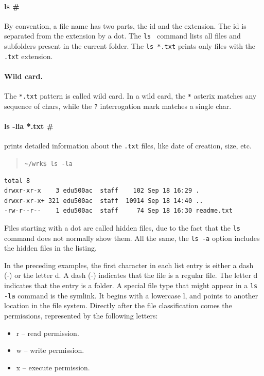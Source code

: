 \documentclass[a4paper,12pt]{book}
\begin{document}
\paragraph{ls \#} 
By convention, a file name has
two parts, the id and the extension. The id
is separated from the extension by a dot.
The \verb|ls | command lists all files
and subfolders present in the current folder.
The \verb|ls *.txt| prints only files
with the \verb|.txt| extension.

\paragraph{Wild card.} The 
\verb|*.txt| pattern
is called wild card.
In a wild card, the \verb|*| asterix matches
any sequence of chars, while the \verb|?|
interrogation mark matches a single char.

\paragraph{ls -lia *.txt \#} prints detailed
information about the \verb|.txt| files,
like date of creation, size, etc.
\begin{quote}
\verb|~/wrk$ ls -la |  
\end{quote}
\begin{verbatim}
total 8
drwxr-xr-x    3 edu500ac  staff    102 Sep 18 16:29 .
drwxr-xr-x+ 321 edu500ac  staff  10914 Sep 18 14:40 ..
-rw-r--r--    1 edu500ac  staff     74 Sep 18 16:30 readme.txt
\end{verbatim}

Files starting with a dot are called hidden files,
due to the fact that the \verb|ls| command does not
normally show them. All the same,
the \verb|ls -a| option includes the
hidden files in the listing.

In the preceding examples, the first character
in each list entry is either a dash (-) or the letter d.
A dash (-) indicates that the file is a regular file.
The letter d indicates that the entry is a folder.
A special file type that might appear in a
\verb|ls -la| command is the symlink. It begins
with a lowercase l, and points to another location
in the file system.
Directly after the file classification comes the permissions,
represented by the following letters:
\begin{itemize}
\item r -- read permission.
\item w -- write permission.
\item x -- execute permission.
\end{itemize}
\end{document}
